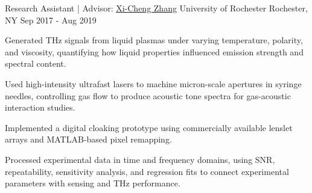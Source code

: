 \begin{cventries}
  \cventry
    {Research Assistant | Advisor: \href{https://labsites.rochester.edu/zhang/}{Xi-Cheng Zhang}}
    {University of Rochester}
    {Rochester, NY}
    {Sep 2017 - Aug 2019}
    {
      \begin{cvitems}
        \item {Generated THz signals from liquid plasmas under varying temperature, polarity, and viscosity, quantifying how liquid properties influenced emission strength and spectral content.}
        \item {Used high-intensity ultrafast lasers to machine micron-scale apertures in syringe needles, controlling gas flow to produce acoustic tone spectra for gas-acoustic interaction studies.}
        \item {Implemented a digital cloaking prototype using commercially available lenslet arrays and MATLAB-based pixel remapping.}
        \item {Processed experimental data in time and frequency domains, using SNR, repeatability, sensitivity analysis, and regression fits to connect experimental parameters with sensing and THz performance.}
      \end{cvitems}
    }

\end{cventries}
